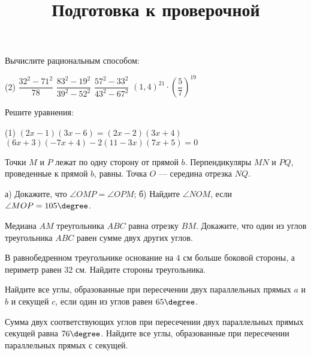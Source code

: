 \begin{class}[number=7]
	\title{Подготовка к проверочной}
	\begin{listofex}
		\item Вычислите рациональным способом:
		\begin{tasks}(2)
			\task \( \dfrac{32^2-71^2}{78}  \)
			\task \( \dfrac{83^2-19^2}{39^2-52^2} \)
			\task \( \dfrac{57^2-33^2}{43^2-67^2} \)
			\task \( (1,4)^{21} \cdot \left( \dfrac{5}{7} \right)^{19} \)
		\end{tasks}
		\item Решите уравнения:
		\begin{tasks}(1)
			\task \( (2x-1)(3x-6)=(2x-2)(3x+4) \)
			\task \( (6x+3)(-7x+4) - 2(11-3x)(7x+5)=0 \)
		\end{tasks}
		\item Точки \(M\) и \(P\) лежат по одну сторону от прямой \(b\). Перпендикуляры \(MN\) и \(PQ\), проведенные к прямой \(b\), равны. Точка \(O\) --- середина отрезка \(NQ\).
		\begin{tasks}
			\task а) Докажите, что \( \angle OMP= \angle OPM \);
			\task б) Найдите \( \angle NOM \), если \(\angle MOP = 105 \degree\).
		\end{tasks}
		\item Медиана \(AM\) треугольника \(ABC\) равна отрезку \(BM\). Докажите, что один из углов треугольника \(ABC\) равен сумме двух других углов.
		\item В равнобедренном треугольнике основание на \(4\) см больше боковой стороны, а периметр равен \(32\) см. Найдите стороны треугольника.
		\item Найдите все углы, образованные при пересечении двух параллельных прямых \(a\) и \(b\) и секущей \(c\), если один из углов равен \(65 \degree\).
		\item Сумма двух соответствующих углов при пересечении двух параллельных прямых секущей равна \(76 \degree\). Найдите все углы, образованные при пересечении параллельных прямых с секущей.
	\end{listofex}
\end{class}


